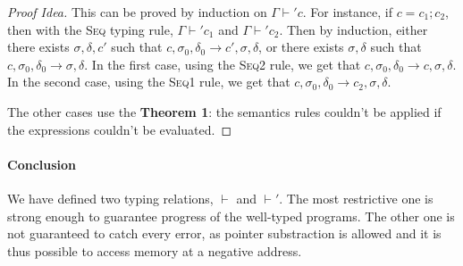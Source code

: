 \begin{proof}[Proof Idea]
  This can be proved by induction on $\Gamma \vdash' c$. For instance, if $c=c_1;c_2$, then with the \textsc{Seq} typing rule, $\Gamma\vdash' c_1$ and $\Gamma\vdash' c_2$.
  Then by induction, either there exists $\sigma,\delta,c'$ such that $c,\sigma_0,\delta_0\longrightarrow c',\sigma,\delta$, or there exists $\sigma,\delta$ such that $c,\sigma_0,\delta_0\longrightarrow \sigma,\delta$.
  In the first case, using the \textsc{Seq2} rule, we get that $c,\sigma_0,\delta_0\longrightarrow c,\sigma,\delta$.
  In the second case, using the \textsc{Seq1} rule, we get that $c,\sigma_0,\delta_0\longrightarrow c_2,\sigma,\delta$.

  The other cases use the \textbf{Theorem 1}: the semantics rules couldn't be applied if the expressions couldn't be evaluated.

\end{proof}

\paragraph{Conclusion}
We have defined two typing relations, $\vdash$ and $\vdash'$. The most restrictive one is strong enough to guarantee progress of the well-typed programs. The other one is not guaranteed to catch every error, as pointer substraction is allowed and it is thus possible to access memory at a negative address.
